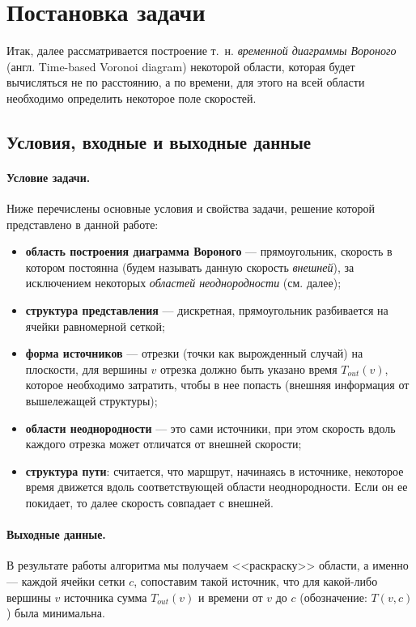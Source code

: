 \documentclass[12pt]{article}
\begin{document}
\section{Постановка задачи}
\label{task}
Итак, далее рассматривается построение т.~н. \emph{временной диаграммы Вороного}
(англ. Time-based Voronoi diagram) некоторой области, которая будет 
вычисляться не по расстоянию, а по времени, для этого на всей области
необходимо определить некоторое поле скоростей.

\subsection{Условия, входные и выходные данные}
\label{props}

\paragraph{Условие задачи.} Ниже перечислены
основные условия и свойства задачи, решение которой представлено в данной работе:
\begin{itemize}
\item \textbf{область построения диаграмма Вороного} --- прямоугольник, 
скорость в котором постоянна (будем называть данную скорость \emph{внешней}), за 
исключением некоторых \emph{областей неоднородности} (см. далее);
\item \textbf{структура представления} --- дискретная, прямоугольник разбивается на 
ячейки равномерной сеткой;
\item \textbf{форма источников} --- отрезки (точки как вырожденный случай)
на плоскости, для вершины $v$ отрезка должно быть указано время $T_{out}(v)$, 
которое необходимо  затратить, 
чтобы в нее попасть (внешняя информация от вышележащей структуры);
\item \textbf{области неоднородности} --- это сами источники, 
при этом скорость вдоль каждого отрезка может отличатся от
внешней скорости;
\item \textbf{структура пути}: считается, что маршрут, начинаясь в источнике,
некоторое время движется вдоль соответствующей области неоднородности.
Если он ее покидает, то далее скорость совпадает с внешней.
\end{itemize}

\paragraph{Выходные данные.}
В результате работы алгоритма мы получаем <<раскраску>> области, 
а именно --- каждой ячейки сетки $c$, сопоставим такой источник, 
что для какой-либо вершины $v$ источника сумма $T_{out}(v)$ и времени от 
$v$ до $c$ (обозначение: $T(v, c)$) была минимальна.
\end{document}
